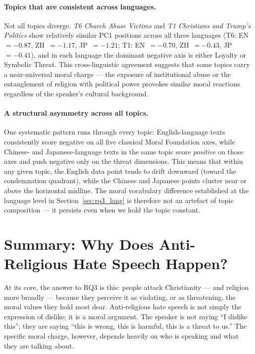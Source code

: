 \documentclass[../CLthesis.tex]{subfiles}
\begin{document}
\paragraph{Topics that are consistent across languages.}
Not all topics diverge. \textit{T6 Church Abuse Victims} and \textit{T1 Christians and Trump's Politics} show relatively similar PC1 positions across all three languages (T6: EN~$= -0.87$, ZH~$= -1.17$, JP~$= -1.21$; T1: EN~$= -0.70$, ZH~$= -0.43$, JP~$= -0.41$), and in each language the dominant negative axis is either Loyalty or Symbolic Threat. This cross-linguistic agreement suggests that some topics carry a near-universal moral charge — the exposure of institutional abuse or the entanglement of religion with political power provokes similar moral reactions regardless of the speaker's cultural background.

\paragraph{A structural asymmetry across all topics.}
One systematic pattern runs through every topic: English-language texts consistently score negative on all five classical Moral Foundation axes, while Chinese- and Japanese-language texts in the same topic score \emph{positive} on those axes and push negative only on the threat dimensions. This means that within any given topic, the English data point tends to drift downward (toward the condemnation quadrant), while the Chinese and Japanese points cluster near or above the horizontal midline. The moral vocabulary difference established at the language level in Section~\ref{sec:rq3_lang} is therefore not an artefact of topic composition — it persists even when we hold the topic constant.


\section{Summary: Why Does Anti-Religious Hate Speech Happen?}
\label{sec:rq3_summary}
At its core, the answer to RQ3 is this: people attack Christianity — and religion more broadly — because they perceive it as violating, or as threatening, the moral values they hold most dear. Anti-religious hate speech is not simply the expression of dislike; it is a moral argument. The speaker is not saying ``I dislike this''; they are saying ``this is wrong, this is harmful, this is a threat to us.'' The specific moral charge, however, depends heavily on who is speaking and what they are talking about.
\end{document}

